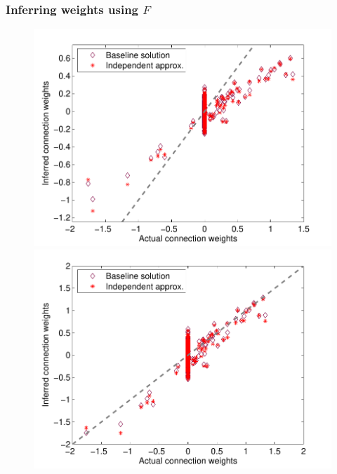 \clearpage
\subsubsection{Inferring weights using $F$}

\begin{figure}[h]
\centering
\begin{minipage}[c]{0.45\hsize}
\includegraphics[width=\hsize]{../figs/Figure2_fluor_base_vs_iid}
\end{minipage}
\begin{minipage}[c]{0.45\hsize}
\includegraphics[width=\hsize]{../figs/Figure2b_fluor_base_vs_iid}
\end{minipage}

\end{figure}
